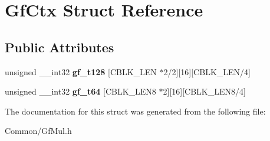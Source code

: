 \hypertarget{struct_gf_ctx}{}\section{Gf\+Ctx Struct Reference}
\label{struct_gf_ctx}
\subsection*{Public Attributes}
\begin{DoxyCompactItemize}
\item 
\mbox{\label{struct_gf_ctx_a84890321ebc6f4eae255261c8e6347f2}} 
unsigned \+\_\+\+\_\+int32 {\bfseries gf\+\_\+t128} \mbox{[}C\+B\+L\+K\+\_\+\+L\+EN $\ast$2/2\mbox{]}\mbox{[}16\mbox{]}\mbox{[}C\+B\+L\+K\+\_\+\+L\+EN/4\mbox{]}
\item 
\mbox{\label{struct_gf_ctx_a44d3394dbe5643e0494bb1752cd2e4e2}} 
unsigned \+\_\+\+\_\+int32 {\bfseries gf\+\_\+t64} \mbox{[}C\+B\+L\+K\+\_\+\+L\+E\+N8 $\ast$2\mbox{]}\mbox{[}16\mbox{]}\mbox{[}C\+B\+L\+K\+\_\+\+L\+E\+N8/4\mbox{]}
\end{DoxyCompactItemize}


The documentation for this struct was generated from the following file\+:\begin{DoxyCompactItemize}
\item 
Common/Gf\+Mul.\+h\end{DoxyCompactItemize}
